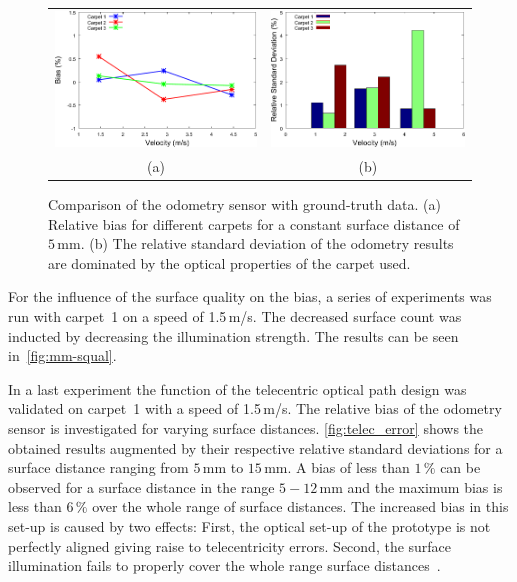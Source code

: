 \documentclass[12pt,a4paper]{article}
\begin{document}
\begin{figure}[t]
\begin{center}
\begin{tabular}{cc}
\includegraphics[width=0.47\columnwidth]{figures/mm_bias} &
\includegraphics[width=0.47\columnwidth]{figures/mm_dev} \\
(a) & (b) \\
\end{tabular}
\caption{\label{fig:bias}
Comparison of the odometry sensor with ground-truth data. (a) Relative bias for different carpets for a constant
surface distance of $5\,$mm. (b) The relative standard deviation of the odometry results are dominated by the
optical properties of the carpet used.}
\end{center}
\end{figure}

For the influence of the surface quality on the bias, a series of experiments was run with carpet~1 on a speed of 1.5\,m/s.
The decreased surface count was inducted by decreasing the illumination strength.
The results can be seen in~\autoref{fig:mm-squal}.


In a last experiment the function of the telecentric optical path design was validated on carpet~1 with a speed of 1.5\,m/s.
The relative bias of the odometry sensor is investigated for varying surface distances.
\autoref{fig:telec_error} shows the obtained results augmented by their respective relative standard deviations for a surface distance ranging from $5\,$mm to $15\,$mm. 
A bias of less than $1\,\%$ can be observed for a surface distance in the range $5-12\,$mm and the maximum bias is less than $6\,\%$ over the whole range of surface distances.
The increased bias in this set-up is caused by two effects: First, the optical set-up of the prototype is not perfectly aligned giving raise to telecentricity errors. 
Second, the surface illumination fails to properly cover the whole range surface distances~\cite{i2mtc}.
\end{document}
